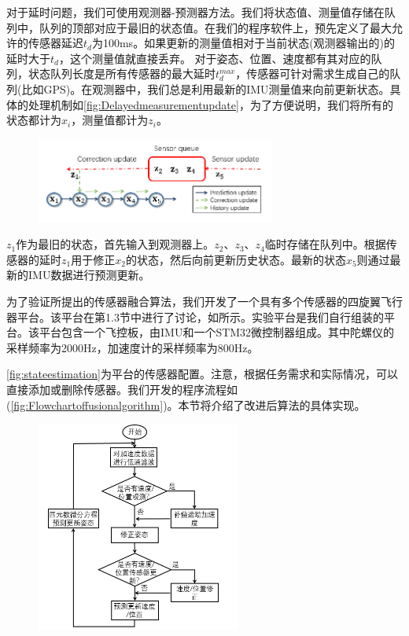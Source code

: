 \documentclass[
  type=master
]{gdutthesis}
\begin{document}
对于延时问题，我们可使用观测器-预测器方法\cite{khosravian2014velocity}。我们将状态值、测量值存储在队列中，队列的顶部对应于最旧的状态值。在我们的程序软件上，预先定义了最大允许的传感器延迟$t_d$为100ms。如果更新的测量值相对于当前状态(观测器输出的)的延时大于$t_d$，这个测量值就直接丢弃。
对于姿态、位置、速度都有其对应的队列，状态队列长度是所有传感器的最大延时$t_d^{max}$，传感器可针对需求生成自己的队列(比如GPS)。在观测器中，我们总是利用最新的IMU测量值来向前更新状态。具体的处理机制如\autoref{fig:Delayedmeasurementupdate}，为了方便说明，我们将所有的状态都计为$x_i$，测量值都计为$z_i$。
\begin{figure}[htbp]
	\centering
	\includegraphics[width=0.7\textwidth]{Delayed and out-of-order measurement update.png}
	\label{fig:Delayedmeasurementupdate}
\end{figure} 

$z_1$作为最旧的状态，首先输入到观测器上。$z_2$、$z_3$、$z_4$临时存储在队列中。根据传感器的延时$z_1$用于修正$x_2$的状态，然后向前更新历史状态。最新的状态$x_5$则通过最新的IMU数据进行预测更新。

为了验证所提出的传感器融合算法，我们开发了一个具有多个传感器的四旋翼飞行器平台。该平台在第1.3节中进行了讨论，如所示。实验平台是我们自行组装的平台。该平台包含一个飞控板，由IMU和一个STM32微控制器组成。其中陀螺仪的采样频率为2000Hz，加速度计的采样频率为800Hz。

\autoref{fig:stateestimation}为平台的传感器配置。注意，根据任务需求和实际情况，可以直接添加或删除传感器。我们开发的程序流程如(\autoref{fig:Flowchartoffusionalgorithm})。本节将介绍了改进后算法的具体实现。
\begin{figure}[htbp]
	\centering
	\includegraphics[width=0.6\textwidth]{屏幕截图 2022-03-06 210135.png}
	\label{fig:Flowchartoffusionalgorithm}
\end{figure}
\end{document}
